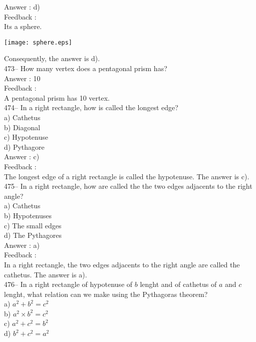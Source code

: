 ﻿\documentclass[letterpaper, 12pt]{article}
\begin{document}
Answer : d)\\

Feedback : \\
Its a sphere.
    \begin{center}
    \texttt{[image: sphere.eps]}
    \end{center}

Consequently, the answer is d).\\

473-- How many vertex does a pentagonal prism has?\\

Answer : 10\\

Feedback : \\
A pentagonal prism has 10 vertex. \\


474-- In a right rectangle, how is called the longest edge?\\
a) Cathetus\\
b) Diagonal\\
c) Hypotenuse\\
d) Pythagore\\

Answer :  c)\\

Feedback : \\
The longest edge of a right rectangle is called the hypotenuse.
The answer is c).\\


475-- In a right rectangle, how are called the the two edges adjacents to the right angle?\\
a) Cathetus\\
b) Hypotenuses\\
c) The small edges\\
d) The Pythagores\\

Answer :  a)\\

Feedback : \\
In a right rectangle, the two edges adjacents to the right angle are called the cathetus.  The answer is a).\\

476-- In a right rectangle of hypotenuse of $b$ lenght and of cathetus of $a$ and $c$ lenght, what relation can we make using the Pythagoras theorem?\\
a) $a^{2}+b^{2}=c^{2}$\\
b) $a^{2}\times b^{2}=c^{2}$\\
c) $a^{2}+c^{2}=b^{2}$\\
d) $b^{2}+c^{2}=a^{2}$\\
\end{document}

